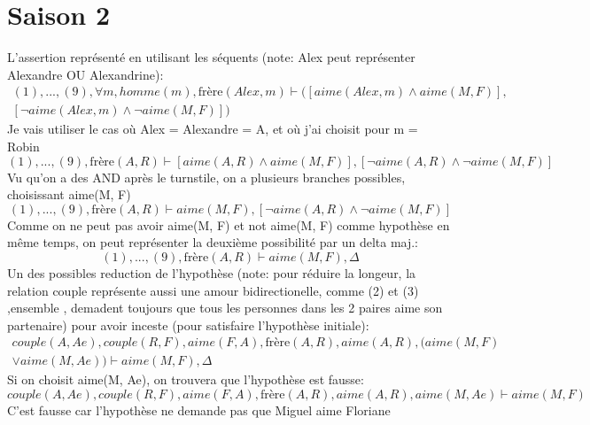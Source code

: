 \documentclass{article}
\begin{document}
\section{Saison 2}
    L'assertion représenté en utilisant les séquents (note: Alex peut représenter Alexandre OU Alexandrine):
    \begin{displaymath}
    \begin{split}
    (1), ..., (9), \forall m, homme(m), \text{frère}(Alex, m) \vdash ([aime(Alex, m) \land aime(M, F)], \\
    [\neg aime(Alex, m) \land \neg aime(M, F)])
    \end{split}
    \end{displaymath}
    Je vais utiliser le cas où Alex = Alexandre = A, et où j'ai choisit pour m = Robin
    \begin{displaymath}
    (1), ..., (9), \text{frère}(A, R) \vdash [aime(A, R) \land aime(M, F)], [\neg aime(A, R) \land \neg aime(M, F)]
    \end{displaymath}
    Vu qu'on a des AND après le turnstile, on a plusieurs branches possibles, choisissant aime(M, F) 
    \begin{displaymath}
    (1), ..., (9), \text{frère}(A, R) \vdash aime(M, F), [\neg aime(A, R) \land \neg aime(M, F)]
    \end{displaymath}
    Comme on ne peut pas avoir aime(M, F) et not aime(M, F) comme hypothèse en même temps, on peut représenter la deuxième possibilité par un delta maj.:
    \begin{displaymath}
    (1), ..., (9), \text{frère}(A, R) \vdash aime(M, F), \Delta
    \end{displaymath}
    Un des possibles reduction de l'hypothèse (note: pour réduire la longeur, la relation couple représente aussi une amour bidirectionelle, comme (2) et (3) ,ensemble , demadent toujours que tous les personnes dans les 2 paires aime son partenaire) pour avoir inceste (pour satisfaire l'hypothèse initiale):
    \begin{displaymath}
    \begin{split}
    couple(A, Ae), couple(R, F), aime(F, A), \text{frère}(A, R), aime(A, R), (aime(M, F) \\
    \lor aime(M, Ae)) \vdash aime(M, F), \Delta
    \end{split}
    \end{displaymath}
    Si on choisit aime(M, Ae), on trouvera que l'hypothèse est fausse:
    \begin{displaymath}
    couple(A, Ae), couple(R, F), aime(F, A), \text{frère}(A, R), aime(A, R), aime(M, Ae) \vdash aime(M, F)
    \end{displaymath}
    C'est fausse car l'hypothèse ne demande pas que Miguel aime Floriane
\end{document}
